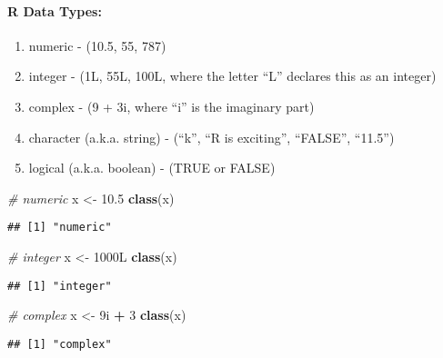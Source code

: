 \documentclass[
]{article}
\newenvironment{Shaded}{\begin{snugshade}}{\end{snugshade}}
\newcommand{\CommentTok}[1]{\textcolor[rgb]{0.56,0.35,0.01}{\textit{#1}}}
\newcommand{\DecValTok}[1]{\textcolor[rgb]{0.00,0.00,0.81}{#1}}
\newcommand{\FloatTok}[1]{\textcolor[rgb]{0.00,0.00,0.81}{#1}}
\newcommand{\FunctionTok}[1]{\textcolor[rgb]{0.13,0.29,0.53}{\textbf{#1}}}
\newcommand{\NormalTok}[1]{#1}
\newcommand{\OtherTok}[1]{\textcolor[rgb]{0.56,0.35,0.01}{#1}}
\newcommand{\SpecialCharTok}[1]{\textcolor[rgb]{0.81,0.36,0.00}{\textbf{#1}}}
\providecommand{\tightlist}{%
  \setlength{\itemsep}{0pt}\setlength{\parskip}{0pt}}
\begin{document}
\hypertarget{r-data-types}{%
\paragraph{R Data Types:}\label{r-data-types}}

\begin{enumerate}
\def\labelenumi{\arabic{enumi}.}
\tightlist
\item
  numeric - (10.5, 55, 787)
\item
  integer - (1L, 55L, 100L, where the letter ``L'' declares this as an
  integer)
\item
  complex - (9 + 3i, where ``i'' is the imaginary part)
\item
  character (a.k.a. string) - (``k'', ``R is exciting'', ``FALSE'',
  ``11.5'')
\item
  logical (a.k.a. boolean) - (TRUE or FALSE)
\end{enumerate}

\begin{Shaded}
\begin{Highlighting}[]
\CommentTok{\# numeric}
\NormalTok{x }\OtherTok{\textless{}{-}} \FloatTok{10.5}
\FunctionTok{class}\NormalTok{(x)}
\end{Highlighting}
\end{Shaded}

\begin{verbatim}
## [1] "numeric"
\end{verbatim}

\begin{Shaded}
\begin{Highlighting}[]
\CommentTok{\# integer}
\NormalTok{x }\OtherTok{\textless{}{-}}\NormalTok{ 1000L}
\FunctionTok{class}\NormalTok{(x)}
\end{Highlighting}
\end{Shaded}

\begin{verbatim}
## [1] "integer"
\end{verbatim}

\begin{Shaded}
\begin{Highlighting}[]
\CommentTok{\# complex}
\NormalTok{x }\OtherTok{\textless{}{-}}\NormalTok{ 9i }\SpecialCharTok{+} \DecValTok{3}
\FunctionTok{class}\NormalTok{(x)}
\end{Highlighting}
\end{Shaded}

\begin{verbatim}
## [1] "complex"
\end{verbatim}
\end{document}
